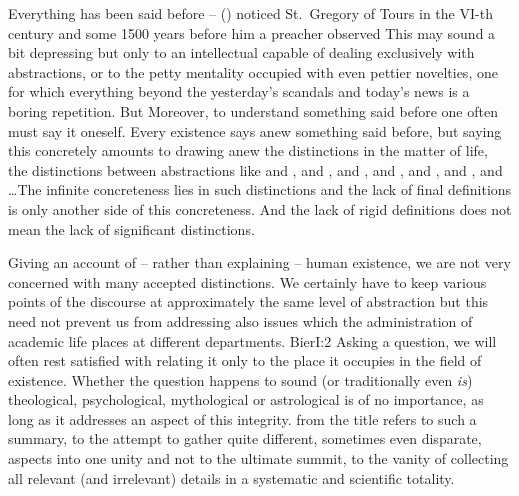 %
Everything has been said before -- {} () noticed St.~Gregory of Tours in the VI-th century and some 1500 years
before him a preacher observed  This may sound a bit depressing
but only to an intellectual capable of dealing exclusively with abstractions, or to
the petty mentality occupied with even pettier novelties, one  for which everything beyond the yesterday's
scandals and today's news is a boring repetition. But  Moreover, to understand something
  said before one often must say it 
oneself. Every existence says anew something said before, but saying this
concretely amounts to drawing anew the distinctions in the matter of life, the
distinctions between abstractions like  and ,
 and ,  and ,
 and ,  and ,  and
,  and \ldots The infinite concreteness lies in
such distinctions and the lack of final definitions is only another side of this
concreteness. And the lack of rigid definitions does not mean the lack of
significant distinctions.

Giving an account of -- rather than explaining -- human existence, we are not
very concerned with many accepted distinctions. We certainly have to keep
various points of the discourse at approximately the same level of abstraction
but this need not prevent us from addressing also issues which the
administration of academic life places at different
departments. \citet{Philosophy is first of all a science about human being,
  about integral human being and of integral human
  being.}{Bier}{I:2} 
Asking a question, we will often rest satisfied with relating it only to
the place it occupies in the field of existence. Whether the question happens to
sound (or traditionally even {\em is}) theological, psychological, mythological or
astrological is of no importance, as long as it addresses an aspect of this
integrity.  from the title refers to such a summary, to the 
attempt to 
gather quite different, sometimes even disparate, aspects into one unity and not
to the ultimate summit, 
to the vanity of collecting all relevant (and irrelevant) details in a systematic
and scientific totality.

